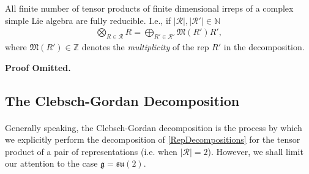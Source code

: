 \documentclass[11pt,fleqn]{article}
\renewenvironment{prop}{\begin{pBox}\begin{propT}}{\end{propT}\end{pBox}}
\begin{document}
\begin{prop}
	All finite number of tensor products of finite dimensional irreps of a complex simple Lie algebra are fully reducible. I.e., if $|\mathcal{R}|, |\mathcal{R}'| \in \mathbb{N}$
		\begin{align}\label{RepDecompositions}
			\bigotimes_{R \in \mathcal{R}} R = \bigoplus_{R' \in \mathcal{R}'} \mathfrak{M}(R') R',
		\end{align}
	where $\mathfrak{M}(R') \in \mathbb{Z}$ denotes the \textit{multiplicity} of the rep $R'$ in the decomposition.
\end{prop}
\textbf{Proof Omitted.}

\subsection{The Clebsch-Gordan Decomposition}

\paragraph{} Generally speaking, the Clebsch-Gordan decomposition is the process by which we explicitly perform the decomposition of \eqref{RepDecompositions} for the tensor product of a pair of representations (i.e. when $|\mathcal{R}| = 2$). However, we shall limit our attention to the case $\mathfrak{g} = \mathfrak{su}(2)$.
\end{document}
